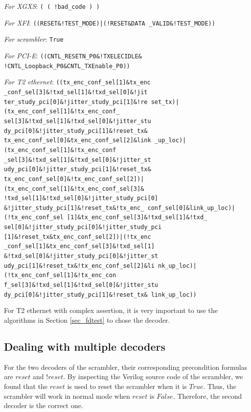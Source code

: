 \documentclass[journal]{IEEEtran}
\begin{document}
\emph{For XGXS}:
\texttt{( ( !bad\_code ) )}

\emph{For XFI}:
\texttt{((RESET\&!TEST\_MODE)|(!RESET\&DATA
\_VALID\&!TEST\_MODE))}

\emph{For scrambler}:
\texttt{True}

\emph{For PCI-E}:
\texttt{((CNTL\_RESETN\_P0\&!TXELECIDLE\&
!CNTL\_Loopback\_P0\&CNTL\_TXEnable\_P0))}

\emph{For T2 ethernet}:
\texttt{((tx\_enc\_conf\_sel[1]\&tx\_enc
\_conf\_sel[3]\&!txd\_sel[1]\&!txd\_sel[0]\&!jit
ter\_study\_pci[0]\&!jitter\_study\_pci[1]\&!re
set\_tx)|(tx\_enc\_conf\_sel[1]\&!tx\_enc\_conf\_
sel[3]\&!txd\_sel[1]\&!txd\_sel[0]\&!jitter\_stu
dy\_pci[0]\&!jitter\_study\_pci[1]\&!reset\_tx\&
tx\_enc\_conf\_sel[0]\&tx\_enc\_conf\_sel[2]\&link
\_up\_loc)|(tx\_enc\_conf\_sel[1]\&!tx\_enc\_conf
\_sel[3]\&!txd\_sel[1]\&!txd\_sel[0]\&!jitter\_st
udy\_pci[0]\&!jitter\_study\_pci[1]\&!reset\_tx\&
tx\_enc\_conf\_sel[0]\&!tx\_enc\_conf\_sel[2])|
(tx\_enc\_conf\_sel[1]\&!tx\_enc\_conf\_sel[3]\&
!txd\_sel[1]\&!txd\_sel[0]\&!jitter\_study\_pci[0]
\&!jitter\_study\_pci[1]\&!reset\_tx\&!tx\_enc\_
conf\_sel[0]\&link\_up\_loc)|(!tx\_enc\_conf\_sel
[1]\&tx\_enc\_conf\_sel[3]\&!txd\_sel[1]\&!txd\_
sel[0]\&!jitter\_study\_pci[0]\&!jitter\_study\_pci
[1]\&!reset\_tx\&tx\_enc\_conf\_sel[2])|(!tx\_enc
\_conf\_sel[1]\&tx\_enc\_conf\_sel[3]\&!txd\_sel[1]
\&!txd\_sel[0]\&!jitter\_study\_pci[0]\&!jitter\_st
udy\_pci[1]\&!reset\_tx\&!tx\_enc\_conf\_sel[2]\&li
nk\_up\_loc)|(!tx\_enc\_conf\_sel[1]\&!tx\_enc\_con
f\_sel[3]\&!txd\_sel[1]\&!txd\_sel[0]\&!jitter\_stu
dy\_pci[0]\&!jitter\_study\_pci[1]\&!reset\_tx\&
link\_up\_loc))}

For T2 ethernet with complex assertion,
it is very important to use the algorithms in Section \ref{sec_fdtest} to chose the decoder.


\subsection{Dealing with multiple decoders}\label{subsec_exp_muldec}

For the two decoders of the scrambler,
their corresponding precondition formulas are $reset$ and $!reset$.
By inspecting the Verilog source code of the scrambler,
we found that the $reset$ is used to reset the scrambler when it is $True$.
Thus,
the scrambler will work in normal mode when $reset$ is $False$.
Therefore,
the second decoder is the correct one.
\end{document}
